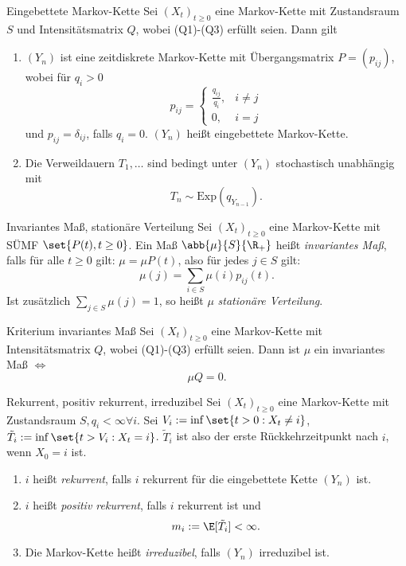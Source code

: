 \begin{karte}{Eingebettete Markov-Kette}
    Sei \((X_t)_{t\geq 0}\) eine Markov-Kette mit Zustandsraum \(S\) und 
    Intensitätsmatrix \(Q\), wobei (Q1)-(Q3) erfüllt seien. Dann gilt 
    \begin{enumerate}
        \item \((Y_n)\) ist eine zeitdiskrete Markov-Kette mit Übergangsmatrix \(P = (p_{ij})\), 
        wobei für \(q_i > 0\) 
        \[ p_{ij} = \begin{cases}
            \frac{q_{ij}}{q_i}, &i\neq j \\
            0, &i=j
        \end{cases} \]
        und \(p_{ij} = \delta_{ij}\), falls \(q_i = 0\). \((Y_n)\) heißt 
        eingebettete Markov-Kette.
        \item Die Verweildauern \(T_1, \ldots \) sind bedingt unter 
        \((Y_n)\) stochastisch unabhängig mit 
        \[ T_n \sim \mathrm{Exp}(q_{Y_{n-1}}). \]
    \end{enumerate}
\end{karte}

\begin{karte}{Invariantes Maß, stationäre Verteilung}
    Sei \((X_t)_{t\geq 0}\) eine Markov-Kette mit SÜMF \(\set{P(t),t\geq 0}\).
    Ein Maß \( \abb{\mu}{S}{\R_+} \) heißt \textit{invariantes Maß}, falls für alle 
    \(t\geq 0\) gilt:
    \( \mu = \mu P(t) \), also für jedes \(j\in S\) gilt: 
    \[ \mu(j) = \sum_{i\in S} \mu(i) p_{ij}(t). \]
    Ist zusätzlich \( \sum_{j\in S} \mu(j) = 1 \), so heißt \(\mu\) 
    \textit{stationäre Verteilung}.
\end{karte}

\begin{karte}{Kriterium invariantes Maß}
    Sei \((X_t)_{t\geq 0}\) eine Markov-Kette 
    mit Intensitätsmatrix \(Q\), wobei (Q1)-(Q3) 
    erfüllt seien. Dann ist \(\mu\) ein invariantes Maß 
    \( \Leftrightarrow \) 
    \[ \mu Q = 0. \]
\end{karte}

\begin{karte}{Rekurrent, positiv rekurrent, irreduzibel}
    Sei \((X_t)_{t\geq 0}\) eine Markov-Kette mit 
    Zustandsraum \(S,q_i<\infty \forall i\).
    Sei \( V_i := \inf\set{t>0:X_t \neq i} \),
    \(\tilde{T}_i := \inf\set{t>V_i:X_t = i}\).
    \(\tilde{T}_i\) ist also der erste Rückkehrzeitpunkt nach \(i\), 
    wenn \(X_0 = i\) ist.
    \begin{enumerate}
        \item \(i\) heißt \textit{rekurrent}, falls \(i\) rekurrent
        für die eingebettete Kette \((Y_n)\) ist.
        \item \(i\) heißt \textit{positiv rekurrent}, 
        falls \(i\) rekurrent ist und 
        \[ m_i := \E[\tilde{T}_i] < \infty. \]
        \item Die Markov-Kette heißt \textit{irreduzibel}, 
        falls \((Y_n)\) irreduzibel ist.
    \end{enumerate}
\end{karte}

